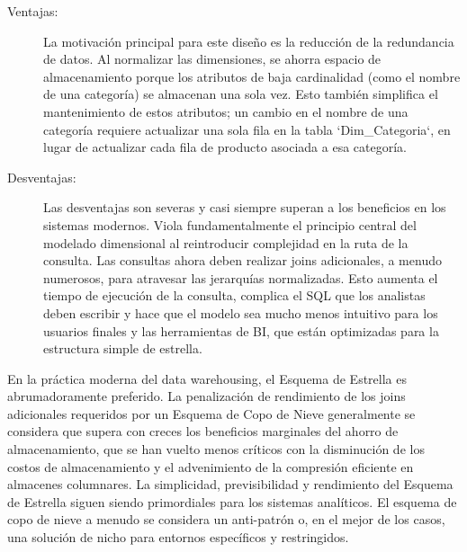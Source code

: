 \documentclass{article}
\newenvironment{remark}[1][Observación]{\begin{trivlist}
\item[\hskip \labelsep {\bfseries #1}]}{\end{trivlist}}
\begin{document}
\begin{description}
    \item[Ventajas:] La motivación principal para este diseño es la reducción de la redundancia de datos. Al normalizar las dimensiones, se ahorra espacio de almacenamiento porque los atributos de baja cardinalidad (como el nombre de una categoría) se almacenan una sola vez. Esto también simplifica el mantenimiento de estos atributos; un cambio en el nombre de una categoría requiere actualizar una sola fila en la tabla `Dim_Categoria`, en lugar de actualizar cada fila de producto asociada a esa categoría.
    \item[Desventajas:] Las desventajas son severas y casi siempre superan a los beneficios en los sistemas modernos. Viola fundamentalmente el principio central del modelado dimensional al reintroducir complejidad en la ruta de la consulta. Las consultas ahora deben realizar joins adicionales, a menudo numerosos, para atravesar las jerarquías normalizadas. Esto aumenta el tiempo de ejecución de la consulta, complica el SQL que los analistas deben escribir y hace que el modelo sea mucho menos intuitivo para los usuarios finales y las herramientas de BI, que están optimizadas para la estructura simple de estrella.
\end{description}
\begin{remark}
En la práctica moderna del data warehousing, el Esquema de Estrella es abrumadoramente preferido. La penalización de rendimiento de los joins adicionales requeridos por un Esquema de Copo de Nieve generalmente se considera que supera con creces los beneficios marginales del ahorro de almacenamiento, que se han vuelto menos críticos con la disminución de los costos de almacenamiento y el advenimiento de la compresión eficiente en almacenes columnares. La simplicidad, previsibilidad y rendimiento del Esquema de Estrella siguen siendo primordiales para los sistemas analíticos. El esquema de copo de nieve a menudo se considera un anti-patrón o, en el mejor de los casos, una solución de nicho para entornos específicos y restringidos.
\end{remark}
\end{document}

